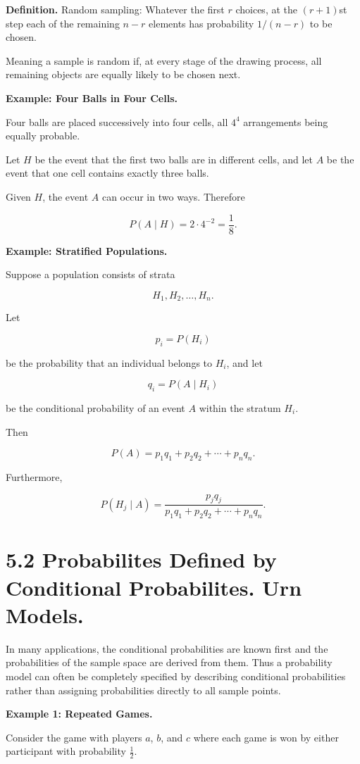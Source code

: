 \documentclass[12pt]{article}
\begin{document}
\textbf{Definition.}
Random sampling: Whatever the first $r$ choices, at the $(r+1)$st step each of the remaining $n-r$ elements has probability $1/(n-r)$ to be chosen.

Meaning a sample is random if, at every stage of the drawing process, all remaining objects are equally likely to be chosen next.

\textbf{Example: Four Balls in Four Cells.}

Four balls are placed successively into four cells, all \(4^4\)
arrangements being equally probable.

Let \(H\) be the event that the first two balls are in different cells,
and let \(A\) be the event that one cell contains exactly three balls.

Given \(H\), the event \(A\) can occur in two ways. Therefore

\[
P(A \mid H)
=
2 \cdot 4^{-2}
=
\frac18.
\]

\textbf{Example: Stratified Populations.}

Suppose a population consists of strata

\[
H_1,H_2,\ldots,H_n.
\]

Let

\[
p_i=P(H_i)
\]

be the probability that an individual belongs to \(H_i\), and let

\[
q_i=P(A\mid H_i)
\]

be the conditional probability of an event \(A\) within the stratum
\(H_i\).

Then

\[
P(A)
=
p_1q_1+p_2q_2+\cdots+p_nq_n.
\]

Furthermore,

\[
P(H_j\mid A)
=
\frac{p_jq_j}
     {p_1q_1+p_2q_2+\cdots+p_nq_n}.
\]

\section*{5.2 Probabilites Defined by Conditional Probabilites. Urn Models.}

In many applications, the conditional probabilities are known first and the
probabilities of the sample space are derived from them. Thus a probability
model can often be completely specified by describing conditional
probabilities rather than assigning probabilities directly to all sample
points.

\textbf{Example 1: Repeated Games.}

Consider the game with players $a$, $b$, and $c$ where each game is won by
either participant with probability $\frac12$.
\end{document}
